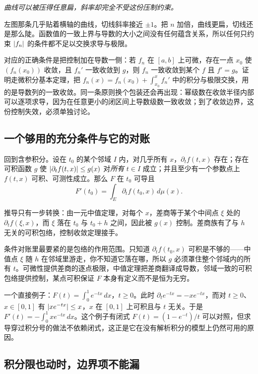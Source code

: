 \emph{曲线可以被压得任意扁，斜率却完全不受这份压制约束。}

左图那条几乎贴着横轴的曲线，切线斜率接近 \(\pm1\)。把 \(n\) 加倍，曲线更扁，切线还是那么陡。函数值的一致上界与导数的大小之间没有任何蕴含关系，所以任何只约束 \(\left|f_n\right|\) 的条件都不足以交换求导与极限。

对应的正确条件是把控制加在导数一侧：若 \(f_n\) 在 \([a,b]\) 上可微，存在一点 \(x_0\) 使 \((f_n(x_0))\) 收敛，且 \(f_n'\) 一致收敛到 \(g\)，则 \(f_n\) 一致收敛到某个 \(f\) 且 \(f'=g\)。证明走微积分基本定理，把 \(f_n(x)=f_n(x_0)+\int_{x_0}^xf_n'\) 中的积分与极限交换，用的是导数列的一致收敛。同一条原则换个包装还会再出现：幂级数在收敛半径内部可以逐项求导，因为在任意更小的闭区间上导数级数一致收敛；到了收敛边界，这份控制失效，必须单独讨论。

\subsection{一个够用的充分条件与它的对账}

回到含参积分。设在 \(t_0\) 的某个邻域 \(I\) 内，对几乎所有 \(x\)，\(\partial_t f(t,x)\) 存在；存在可积函数 \(g\) 使 \(\left|\partial_t f(t,x)\right|\le g(x)\) 对\emph{所有} \(t\in I\) 成立；并且至少有一个参数点上 \(f(t,x)\) 可积、可测性成立。那么 \(F\) 在 \(t_0\) 可导且
\[
F'(t_0)=\int_E\partial_t f(t_0,x)\,d\mu(x).
\]

推导只有一步转换：由一元中值定理，对每个 \(x\)，差商等于某个中间点 \(\xi\) 处的 \(\partial_t f(\xi,x)\)，而 \(\xi\) 落在 \(t_0\) 与 \(t_0+h\) 之间，因此被 \(g(x)\) 控制。差商族有了与 \(h\) 无关的可积包络，控制收敛定理接手。

条件对账里最要紧的是包络的作用范围。只知道 \(\partial_t f(t_0,x)\) 可积是不够的——中值点 \(\xi\) 随 \(h\) 在邻域里游走，你不知道它落在哪，所以 \(g\) 必须罩住整个邻域内的所有 \(t\)。可微性提供差商的逐点极限，中值定理把差商翻译成导数，邻域一致的可积包络提供控制，某点可积保证 \(F\) 本身有定义而不是恒为无穷。

一个直接例子：\(F(t)=\int_0^1e^{-tx}\,dx\)，\(t\ge0\)。此时 \(\partial_t e^{-tx}=-xe^{-tx}\)，而对 \(t\ge0\)、\(x\in[0,1]\) 有 \(\left|xe^{-tx}\right|\le x\)，\(x\) 在 \([0,1]\) 上可积且与 \(t\) 无关。于是 \(F'(t)=-\int_0^1xe^{-tx}\,dx\)。这个例子有闭式 \(F(t)=(1-e^{-t})/t\) 可以对照，但求导穿过积分号的做法不依赖闭式，这正是它在没有解析积分的模型上仍然可用的原因。

\subsection{积分限也动时，边界项不能漏}

